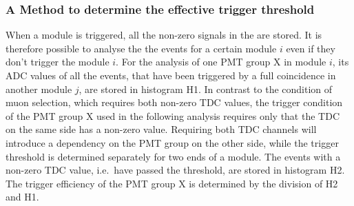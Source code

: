 \subsubsection*{A Method to determine the effective trigger threshold}

When a module is triggered, all the non-zero signals in the \mvs{} are stored. It is therefore possible to analyse the the events for a certain module $i$ even if they don't trigger the module $i$. For the analysis of one PMT group X in module $i$, its ADC values of all the events, that have been triggered by a full coincidence in another module $j$, are stored in histogram H1. In contrast to the condition of muon selection, which requires both non-zero TDC values, the trigger condition of the PMT group X used in the following analysis requires only that the TDC on the same side has a non-zero value. Requiring both TDC channels will introduce a dependency on the PMT group on the other side, while the trigger threshold is determined separately for two ends of a module. The events with a non-zero TDC value, i.e.\, have passed the threshold, are stored in histogram H2. The trigger efficiency of the PMT group X is determined by the division of H2 and H1.

